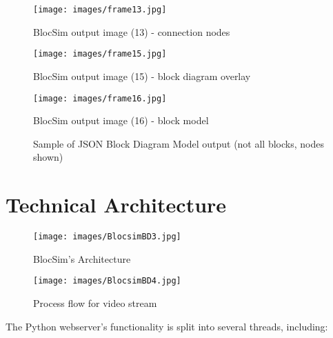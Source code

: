 \begin{figure}[ht!]
\centering
\texttt{[image: images/frame13.jpg]}
\caption{BlocSim output image (13) - connection nodes \cite{blocsim}}
\label{im:frame13}
\end{figure}

\begin{figure}[ht!]
\centering
\texttt{[image: images/frame15.jpg]}
\caption{BlocSim output image (15) - block diagram overlay \cite{blocsim}}
\label{im:frame15}
\end{figure}

\begin{figure}[ht!]
\centering
\texttt{[image: images/frame16.jpg]}
\caption{BlocSim output image (16) - block model \cite{blocsim}}
\label{im:frame16}
\end{figure}

\clearpage



\newpage
\begin{figure}[ht!]
	\fontsize{8pt}{8pt}
	\singlespacing
	\begin{mdframed}
	\end{mdframed}
	\caption{Sample of JSON Block Diagram Model output (not all blocks, nodes shown)}
	\label{tab:json}
\end{figure}

\clearpage





\section{Technical Architecture}

\begin{figure}[ht!]
\centering
\texttt{[image: images/BlocsimBD3.jpg]}
\caption{BlocSim's Architecture}
\label{im:BlocsimBD3}
\end{figure}

\begin{figure}[ht!]
\centering
\texttt{[image: images/BlocsimBD4.jpg]}
\caption{Process flow for video stream}
\label{im:BlocsimBD4}
\end{figure}

\clearpage

The Python webserver's functionality is split into several threads, including:

